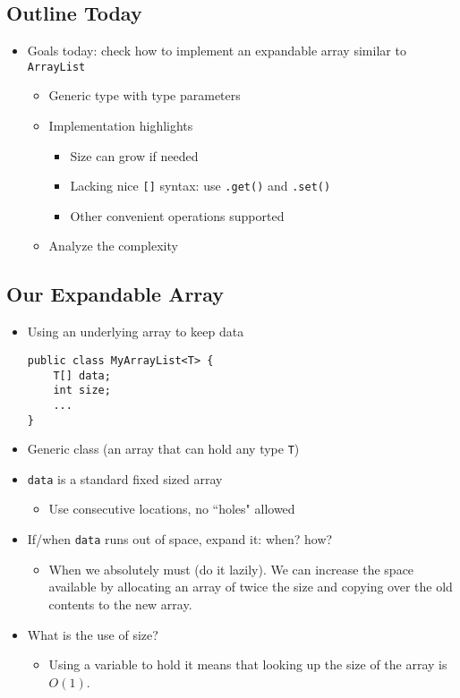 \documentclass[10pt]{article}
\begin{document}
\subsection*{Outline Today}
\begin{itemize}
    \item Goals today: check how to implement an expandable array similar to \texttt{ArrayList}
    \begin{itemize}
        \item Generic type with type parameters
        \item Implementation highlights
        \begin{itemize}
            \item Size can grow if needed
            \item Lacking nice \texttt{[]} syntax: use \texttt{.get()} and \texttt{.set()}
            \item Other convenient operations supported
        \end{itemize}
        \item Analyze the complexity
    \end{itemize}
\end{itemize}

\subsection*{Our Expandable Array}
\begin{itemize}
    \item Using an underlying array to keep data
    \begin{verbatim}
public class MyArrayList<T> {
    T[] data;
    int size;
    ...
}    
    \end{verbatim}
    \item Generic class (an array that can hold any type \texttt{T})
    \item \texttt{data} is a standard fixed sized array
    \begin{itemize}
        \item Use consecutive locations, no ``holes" allowed
    \end{itemize}
    \item If/when \texttt{data} runs out of space, expand it: when? how?
    \begin{itemize}
        \item When we absolutely must (do it lazily). We can increase the space available by allocating an array of twice the size and copying over the old contents to the new array.
    \end{itemize}
    \item What is the use of size?
    \begin{itemize}
        \item Using a variable to hold it means that looking up the size of the array is $O(1)$.
    \end{itemize}
\end{itemize}
\end{document}
